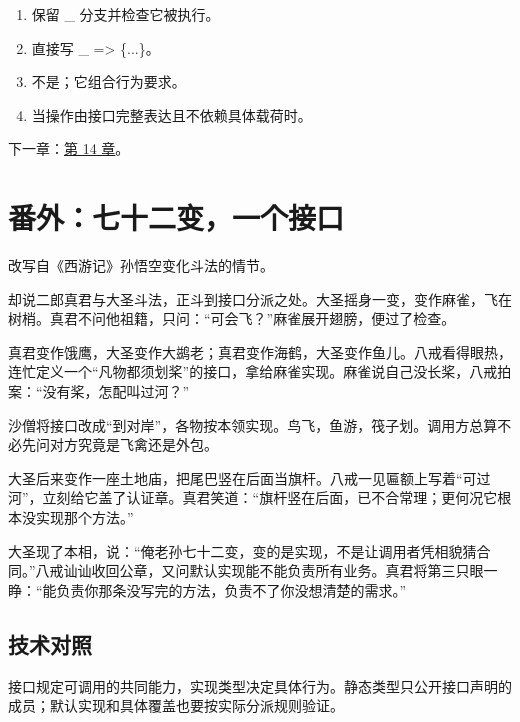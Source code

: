 \begin{enumerate}

\item 保留 \_ 分支并检查它被执行。

\item 直接写 \_ => \{...\}。

\item 不是；它组合行为要求。

\item 当操作由接口完整表达且不依赖具体载荷时。

\end{enumerate}

下一章：\hyperref[ch:14]{第 14 章}。

\section{番外：七十二变，一个接口}

改写自《西游记》孙悟空变化斗法的情节。

却说二郎真君与大圣斗法，正斗到接口分派之处。大圣摇身一变，变作麻雀，飞在树梢。真君不问他祖籍，只问：“可会飞？”麻雀展开翅膀，便过了检查。

真君变作饿鹰，大圣变作大鹚老；真君变作海鹤，大圣变作鱼儿。八戒看得眼热，连忙定义一个“凡物都须划桨”的接口，拿给麻雀实现。麻雀说自己没长桨，八戒拍案：“没有桨，怎配叫过河？”

沙僧将接口改成“到对岸”，各物按本领实现。鸟飞，鱼游，筏子划。调用方总算不必先问对方究竟是飞禽还是外包。

大圣后来变作一座土地庙，把尾巴竖在后面当旗杆。八戒一见匾额上写着“可过河”，立刻给它盖了认证章。真君笑道：“旗杆竖在后面，已不合常理；更何况它根本没实现那个方法。”

大圣现了本相，说：“俺老孙七十二变，变的是实现，不是让调用者凭相貌猜合同。”八戒讪讪收回公章，又问默认实现能不能负责所有业务。真君将第三只眼一睁：“能负责你那条没写完的方法，负责不了你没想清楚的需求。”

\subsection*{技术对照}

接口规定可调用的共同能力，实现类型决定具体行为。静态类型只公开接口声明的成员；默认实现和具体覆盖也要按实际分派规则验证。
